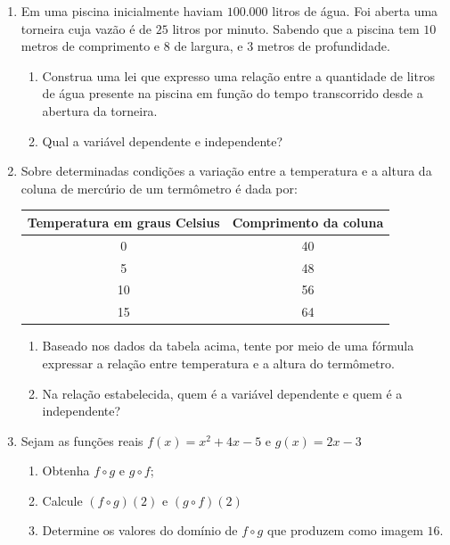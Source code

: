 \documentclass[oneside,a4paper,12pt]{article}
\begin{document}
\begin{enumerate}
	\item Em uma piscina inicialmente haviam $100.000$ litros de água. Foi aberta uma torneira cuja vazão é de $25$ litros por minuto. Sabendo que a piscina tem $10$ metros de comprimento e $8$ de largura, e $3$ metros de profundidade.
	\begin{enumerate}
		\item Construa uma lei que expresso uma relação entre a quantidade de litros de água presente na piscina em função do tempo transcorrido desde a abertura da torneira.
		\item Qual a variável dependente e independente?
	\end{enumerate}

	\item Sobre determinadas condições a variação entre a temperatura e a altura da coluna de mercúrio de um termômetro é dada por:
	\begin{table}[h]
		\centering
		\begin{tabular}{|c|c|}
			\hline
			Temperatura em graus Celsius	&	Comprimento da coluna \\
			\hline
			0		&	40	\\
			\hline
			5		&	48	\\
			\hline
			10		&	56	\\
			\hline
			15		&	64	\\
			\hline
		\end{tabular}
	\end{table}
	\begin{enumerate}
		\item Baseado nos dados da tabela acima, tente por meio de uma fórmula expressar a relação entre temperatura e a altura do termômetro.
		\item Na relação estabelecida, quem é a variável dependente e quem é a independente?
	\end{enumerate}


	\item Sejam as funções reais $f(x) = x^2 + 4x - 5$ e $g(x) = 2x -3$
	\begin{enumerate}
		\item Obtenha $f \circ g$ e $g \circ f$;
		\item Calcule $(f \circ g)(2)$ e $(g \circ f)(2)$
		\item Determine os valores do domínio de $f \circ g$ que produzem como imagem $16$.
	\end{enumerate}

\end{enumerate}


	
\end{document}
